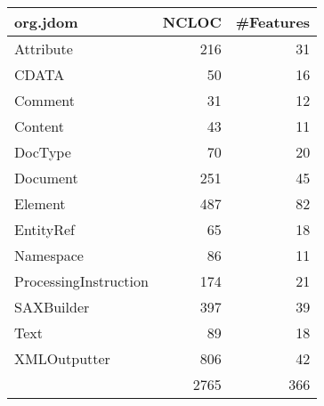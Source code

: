 \begin{tabular}{|l|r|r|}\hline
org.jdom & NCLOC & \#Features\\\hline\hline
Attribute & 216 & 31\\\hline
CDATA & 50 & 16\\\hline
Comment & 31 & 12\\\hline
Content & 43 & 11\\\hline
DocType & 70 & 20\\\hline
Document & 251 & 45\\\hline
Element & 487 & 82\\\hline
EntityRef & 65 & 18\\\hline
Namespace & 86 & 11\\\hline
ProcessingInstruction & 174 & 21\\\hline
SAXBuilder & 397 & 39\\\hline
Text & 89 & 18\\\hline
XMLOutputter & 806 & 42\\\hline
\hline
 & 2765 & 366\\\hline
\end{tabular}

